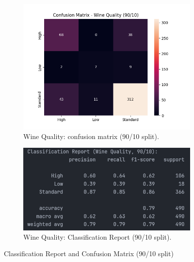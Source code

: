 \begin{figure}[H]
	\centering
	\begin{subfigure}{0.45\textwidth}
		\centering
		\includegraphics[width=\textwidth]{imgs/confusion_mat/confusion_mat__wine_quality__90_vs_10.png}
		\caption{Wine Quality: confusion matrix (90/10 split).}\label{fig:wq-cm-90-10}
	\end{subfigure}
	\hfill
	\begin{subfigure}{0.45\textwidth}
		\centering
		\includegraphics[width=\textwidth]{imgs/confusion_mat/class_rp__wine_quality__90_vs_10.png}
		\caption{Wine Quality: Classification Report (90/10 split).}\label{fig:wq-cr-90-10}
	\end{subfigure}

	\caption{Classification Report and Confusion Matrix (90/10 split)}\label{fig:wq-eval-90-10}
\end{figure}


